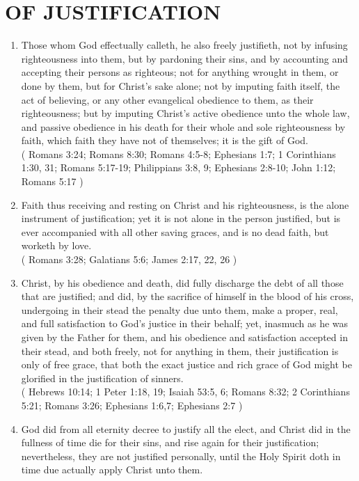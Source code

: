 \documentclass[12pt,a4paper]{book}
\begin{document}
\chapter{OF JUSTIFICATION}
\label{ch-jus}
\begin{enumerate}
\item
\label{ch-jus-1}
Those whom God effectually calleth, he also freely justifieth, not by infusing righteousness into them, but by pardoning their sins, and by accounting and accepting their persons as righteous; not for anything wrought in them, or done by them, but for Christ's sake alone; not by imputing faith itself, the act of believing, or any other evangelical obedience to them, as their righteousness; but by imputing Christ's active obedience unto the whole law, and passive obedience in his death for their whole and sole righteousness by faith, which faith they have not of themselves; it is the gift of God.\\
( Romans 3:24; Romans 8:30; Romans 4:5-8; Ephesians 1:7; 1 Corinthians 1:30, 31; Romans 5:17-19; Philippians 3:8, 9; Ephesians 2:8-10; John 1:12; Romans 5:17 )
\item
\label{ch-jus-2}
Faith thus receiving and resting on Christ and his righteousness, is the alone instrument of justification; yet it is not alone in the person justified, but is ever accompanied with all other saving graces, and is no dead faith, but worketh by love.\\
( Romans 3:28; Galatians 5:6; James 2:17, 22, 26 )
\item
\label{ch-jus-3}
Christ, by his obedience and death, did fully discharge the debt of all those that are justified; and did, by the sacrifice of himself in the blood of his cross, undergoing in their stead the penalty due unto them, make a proper, real, and full satisfaction to God's justice in their behalf; yet, inasmuch as he was given by the Father for them, and his obedience and satisfaction accepted in their stead, and both freely, not for anything in them, their justification is only of free grace, that both the exact justice and rich grace of God might be glorified in the justification of sinners.\\
( Hebrews 10:14; 1 Peter 1:18, 19; Isaiah 53:5, 6; Romans 8:32; 2 Corinthians 5:21; Romans 3:26; Ephesians 1:6,7; Ephesians 2:7 )
\item
\label{ch-jus-4}
God did from all eternity decree to justify all the elect, and Christ did in the fullness of time die for their sins, and rise again for their justification; nevertheless, they are not justified personally, until the Holy Spirit doth in time due actually apply Christ unto them.\\

\end{enumerate}
\end{document}
